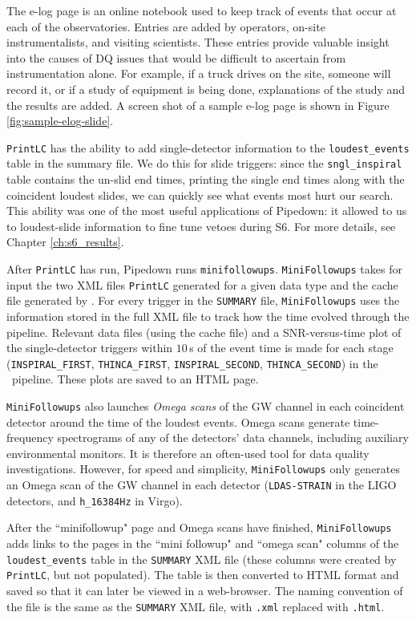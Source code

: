 The e-log page is an online notebook used to keep track of events that occur at
each of the observatories. Entries are added by operators, on-site
instrumentalists, and visiting scientists. These entries provide valuable
insight into the causes of \ac{DQ} issues that would be difficult to ascertain
from instrumentation alone. For example, if a truck drives on the site, someone
will record it, or if a study of equipment is being done, explanations of the
study and the results are added. A screen shot of a sample e-log page is shown
in Figure \ref{fig:sample-elog-slide}.

\texttt{PrintLC} has the ability to add single-detector information to the
\verb|loudest_events| table in the summary file. We do this for slide triggers:
since the \verb|sngl_inspiral| table contains the un-slid end times, printing
the single end times along with the coincident loudest slides, we can quickly
see what events most hurt our search. This ability was one of the most useful
applications of Pipedown: it allowed to us to loudest-slide information to fine
tune vetoes during \ac{S6}. For more details, see Chapter \ref{ch:s6_results}.

After \texttt{PrintLC} has run, Pipedown runs \verb|minifollowups|. \texttt{MiniFollowups} takes
for input the two XML files \texttt{PrintLC} generated for a given data type and the
cache file generated by \ihope. For every trigger in the \verb|SUMMARY| file,
\texttt{MiniFollowups} uses the information stored in the full XML file to track how the
time evolved through the pipeline. Relevant data files (using the cache file)
and a \ac{SNR}-versus-time plot of the single-detector triggers within $10\,$s
of the event time is made for each stage (\verb|INSPIRAL_FIRST|,
\verb|THINCA_FIRST|, \verb|INSPIRAL_SECOND|, \verb|THINCA_SECOND|) in the
\hipe~pipeline. These plots are saved to an HTML page.

\texttt{MiniFollowups} also launches \emph{Omega scans} \cite{omegaScan} of the \ac{GW}
channel in each coincident detector around the time of the loudest events.
Omega scans generate time-frequency spectrograms of any of the detectors' data
channels, including auxiliary environmental monitors. It is therefore an
often-used tool for data quality investigations. However, for speed and
simplicity, \texttt{MiniFollowups} only generates an Omega scan of the \ac{GW} channel
in each detector (\verb|LDAS-STRAIN| in the \ac{LIGO} detectors, and
\verb|h_16384Hz| in Virgo).

After the ``minifollowup" page and Omega scans have finished, \texttt{MiniFollowups}
adds links to the pages in the ``mini followup" and ``omega scan" columns
of the \\ \verb|loudest_events| table in the \verb|SUMMARY| XML file (these
columns were created by \texttt{PrintLC}, but not populated). The table is then
converted to HTML format and saved so that it can later be viewed in a
web-browser. The naming convention of the file is the same as the
\verb|SUMMARY| XML file, with \verb|.xml| replaced with \verb|.html|.

